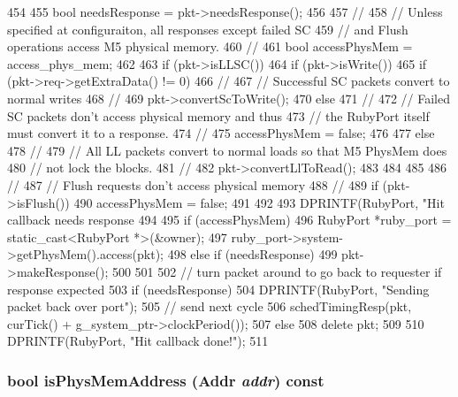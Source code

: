 \begin{DoxyCode}
454 {
455     bool needsResponse = pkt->needsResponse();
456 
457     //
458     // Unless specified at configuraiton, all responses except failed SC 
459     // and Flush operations access M5 physical memory.
460     //
461     bool accessPhysMem = access_phys_mem;
462 
463     if (pkt->isLLSC()) {
464         if (pkt->isWrite()) {
465             if (pkt->req->getExtraData() != 0) {
466                 //
467                 // Successful SC packets convert to normal writes
468                 //
469                 pkt->convertScToWrite();
470             } else {
471                 //
472                 // Failed SC packets don't access physical memory and thus
473                 // the RubyPort itself must convert it to a response.
474                 //
475                 accessPhysMem = false;
476             }
477         } else {
478             //
479             // All LL packets convert to normal loads so that M5 PhysMem does
480             // not lock the blocks.
481             //
482             pkt->convertLlToRead();
483         }
484     }
485 
486     //
487     // Flush requests don't access physical memory
488     //
489     if (pkt->isFlush()) {
490         accessPhysMem = false;
491     }
492 
493     DPRINTF(RubyPort, "Hit callback needs response %
494 
495     if (accessPhysMem) {
496         RubyPort *ruby_port = static_cast<RubyPort *>(&owner);
497         ruby_port->system->getPhysMem().access(pkt);
498     } else if (needsResponse) {
499         pkt->makeResponse();
500     }
501 
502     // turn packet around to go back to requester if response expected
503     if (needsResponse) {
504         DPRINTF(RubyPort, "Sending packet back over port\n");
505         // send next cycle
506         schedTimingResp(pkt, curTick() + g_system_ptr->clockPeriod());
507     } else {
508         delete pkt;
509     }
510     DPRINTF(RubyPort, "Hit callback done!\n");
511 }
\end{DoxyCode}
\hypertarget{classRubyPort_1_1MemSlavePort_aa1da2f433965694958a83f76fcf4adc2}{
\subsubsection[{isPhysMemAddress}]{\setlength{\rightskip}{0pt plus 5cm}bool isPhysMemAddress ({\bf Addr} {\em addr}) const}}
\label{classRubyPort_1_1MemSlavePort_aa1da2f433965694958a83f76fcf4adc2}



